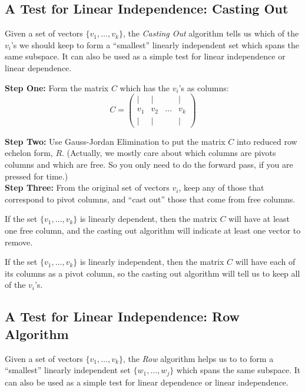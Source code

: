 \documentclass[elementsmain.tex]{subfiles}
\begin{document}
\clearpage

\subsection*{A Test for Linear Independence: Casting Out}

Given a set of vectors $\{v_1, \dots, v_k\}$, the \emph{Casting Out} algorithm tells us which of the $v_i$'s we should keep to form a ``smallest'' linearly independent set which spans the same subspace. It can also be used as a simple test for linear independence or linear dependence.

\noindent
\textbf{Step One:} 
Form the matrix $C$ which has the $v_i$'s as columns:
\[
C = \begin{pmatrix} | & | &  & | \\ v_1 & v_2 & \dots & v_k \\ | & | &  & | \end{pmatrix}
\]
{ }

\noindent
\textbf{Step Two:} 
Use Gauss-Jordan Elimination to put the matrix $C$ into reduced row echelon form, $R$. (Actually, we mostly care about which columns are pivots columns and which are free. So you only need to do the forward pass, if you are pressed for time.)\\

\noindent
\textbf{Step Three:}
From the original set of vectors $v_i$, keep any of those that correspond to pivot columns, and ``cast out'' those that come from free columns.\\

\begin{theorem}\label{thm:16-casting-out}
If the set $\{v_1,\dots, v_k\}$ is linearly dependent, then the matrix $C$ will have at least one free column, and the casting out algorithm will indicate at least one vector to remove.

If the set $\{v_1, \dots, v_k\}$ is linearly independent, then the matrix $C$ will have each of its columns as a pivot column, so the casting out algorithm will tell us to keep all of the $v_i$'s.
\end{theorem}


\subsection*{A Test for Linear Independence: Row Algorithm}

Given a set of vectors $\{v_1, \dots, v_k\}$, the \emph{Row} algorithm helps us to to form a ``smallest'' linearly independent set $\{w_1, \dots, w_j\}$ which spans the same subspace. It can also be used as a simple test for linear dependence or linear independence.
\end{document}
